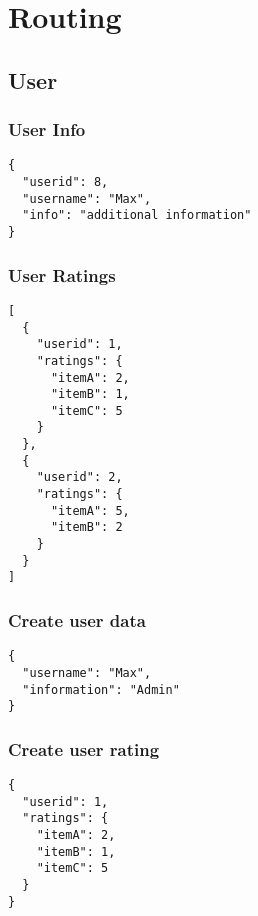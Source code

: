 \section{Routing}

\subsection{User}

\subsubsection{User Info}
\begin{verbatim}
{
  "userid": 8,
  "username": "Max",
  "info": "additional information"
}
\end{verbatim}
\label{code:user_info_json}

\subsubsection{User Ratings}
\begin{verbatim}
[
  {
    "userid": 1,
    "ratings": {
      "itemA": 2,
      "itemB": 1,
      "itemC": 5
    }
  },
  {
    "userid": 2,
    "ratings": {
      "itemA": 5,
      "itemB": 2
    }
  }
]
\end{verbatim}
\label{code:user_ratings_json}

\subsubsection{Create user data}
\begin{verbatim}
{
  "username": "Max",
  "information": "Admin"
}
\end{verbatim}
\label{code:user_create_json}

\subsubsection{Create user rating}
\begin{verbatim}
{
  "userid": 1,
  "ratings": {
    "itemA": 2,
    "itemB": 1,
    "itemC": 5
  }
}
\end{verbatim}
\label{code:user_reating_create_json}

